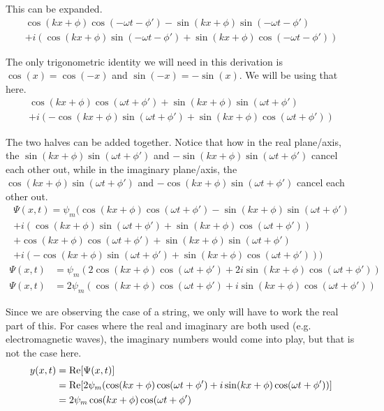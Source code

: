 \documentclass[12pt]{article}
\begin{document}
    This can be expanded.
    \begin{multline}
        \cos(kx + \phi)\cos(-\omega t - \phi') - \sin(kx + \phi)\sin(-\omega t - \phi')\\
            +   i\left( \cos(kx + \phi)\sin(-\omega t - \phi') + \sin(kx + \phi)\cos(-\omega t - \phi') \right)
    \end{multline}

    The only trigonometric identity we will need in this derivation is $\cos(x) = \cos(-x)$ and $\sin(-x) = -\sin(x)$. 
    We will be using that here.
    \begin{multline}
        \cos(kx + \phi)\cos(\omega t + \phi') + \sin(kx + \phi)\sin(\omega t + \phi')\\
            +   i\left( - \cos(kx + \phi)\sin(\omega t + \phi') + \sin(kx + \phi)\cos(\omega t + \phi') \right)
    \end{multline}

    The two halves can be added together. 
    Notice that how in the real plane/axis, the $\sin(kx + \phi)\sin(\omega t + \phi')$ and $-\sin(kx + \phi)\sin(\omega t + \phi')$ cancel each other out, while in the imaginary plane/axis, the $\cos(kx + \phi)\sin(\omega t + \phi')$ and $-\cos(kx + \phi)\sin(\omega t + \phi')$ cancel each other out. 
    \begin{multline}
        \Psi(x,t)   =   \psi_m (\cos(kx + \phi)\cos(\omega t + \phi') - \sin(kx + \phi)\sin(\omega t + \phi')\\
            +   i\left( \cos(kx + \phi)\sin(\omega t + \phi') + \sin(kx + \phi)\cos(\omega t + \phi') \right)\\ + \cos(kx + \phi)\cos(\omega t + \phi') + \sin(kx + \phi)\sin(\omega t + \phi')\\
            +   i\left( - \cos(kx + \phi)\sin(\omega t + \phi') + \sin(kx + \phi)\cos(\omega t + \phi') \right))
    \end{multline}
    \begin{align}
        \Psi(x,t)   &=  \psi_m (2\cos(kx + \phi)\cos(\omega t + \phi') + 2i \sin(kx + \phi)\cos(\omega t + \phi'))\\
        \Psi(x,t)   &=  2 \psi_m (\cos(kx + \phi)\cos(\omega t + \phi') + i \sin(kx + \phi)\cos(\omega t + \phi'))
    \end{align}

    Since we are observing the case of a string, we only will have to work the real part of this.
    For cases where the real and imaginary are both used (e.g. electromagnetic waves), the imaginary numbers would come into play, but that is not the case here. 
    \begin{align}
        y(x,t)  &=  {\rm Re}[\Psi(x,t)]\\
            &=  {\rm Re}[2 \psi_m (\cos(kx + \phi)\cos(\omega t + \phi') + i \sin(kx + \phi)\cos(\omega t + \phi'))]\\
            &=  2 \psi_m \cos(kx + \phi)\cos(\omega t + \phi')
    \end{align}
\end{document}
